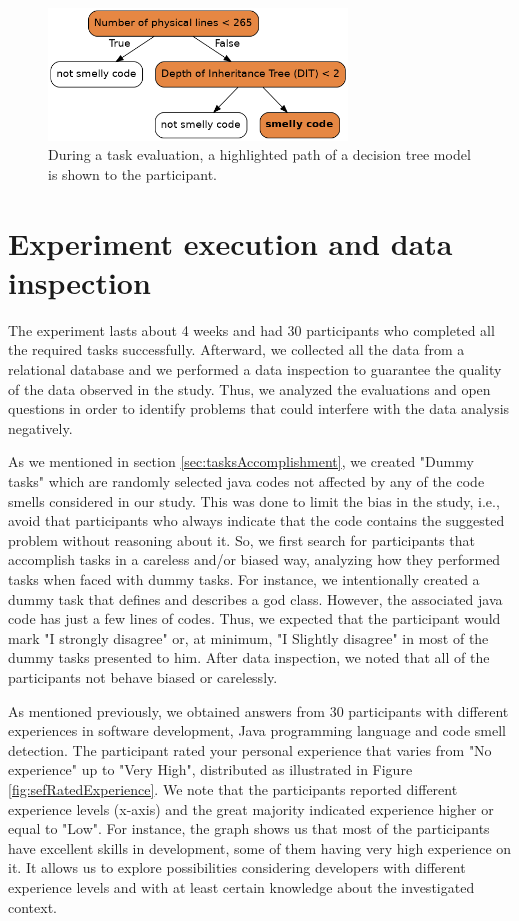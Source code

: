\begin{figure}[H]
\centering
\includegraphics[width=300px]{figures/highlightedTree.png}
\caption{During a task evaluation, a highlighted path of a decision tree model is shown to the participant.}
\label{fig:highlightedDT}
\end{figure}
    
\section{Experiment execution and data inspection}

The experiment lasts about 4 weeks and had 30 participants who completed all the required tasks successfully. Afterward, we collected all the data from a relational database and we performed a data inspection to guarantee the quality of the data observed in the study. Thus, we analyzed the evaluations and open questions in order to identify problems that could interfere with the data analysis negatively.

As we mentioned in section \ref{sec:tasksAccomplishment}, we created "Dummy tasks" which are randomly selected java codes not affected by any of the code smells considered in our study. This was done to limit the bias \cite{palomba2014they} in the study, i.e., avoid that participants who always indicate that the code contains the suggested problem without reasoning about it. So, we first search for participants that accomplish tasks in a careless and/or biased way, analyzing how they performed tasks when faced with dummy tasks. For instance, we intentionally created a dummy task that defines and describes a god class. However, the associated java code has just a few lines of codes. Thus, we expected that the participant would mark "I strongly disagree" or, at minimum, "I Slightly disagree" in most of the dummy tasks presented to him. After data inspection, we noted that all of the participants not behave biased or carelessly. 

As mentioned previously, we obtained answers from 30 participants with different experiences in software development, Java programming language and code smell detection. The participant rated your personal experience that varies from "No experience" up to "Very High", distributed as illustrated in Figure \ref{fig:sefRatedExperience}. We note that the participants reported different experience levels (x-axis) and the great majority indicated experience higher or equal to "Low". For instance, the graph shows us that most of the participants have excellent skills in development, some of them having very high experience on it. It allows us to explore possibilities considering developers with different experience levels and with at least certain knowledge about the investigated context.

